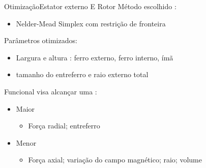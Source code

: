 \documentclass{beamer}
\begin{document}
\begin{frame}{Otimização}{Estator externo E Rotor}
Método escolhido :
\begin{itemize}
	\item Nelder-Mead Simplex com restrição de fronteira
\end{itemize}

Parâmetros otimizados:
\begin{itemize}
	\item Largura e altura : ferro externo, ferro interno, ímã
	\item tamanho do entreferro e raio externo total
\end{itemize}

Funcional visa alcançar uma :
\begin{itemize}
	\item Maior
		\begin{itemize}
		\item Força radial; entreferro
		\end{itemize}
	\item Menor
		\begin{itemize}
		\item Força axial; variação do campo magnético; raio; volume
		\end{itemize}
\end{itemize} 
\end{frame}

\end{document}
